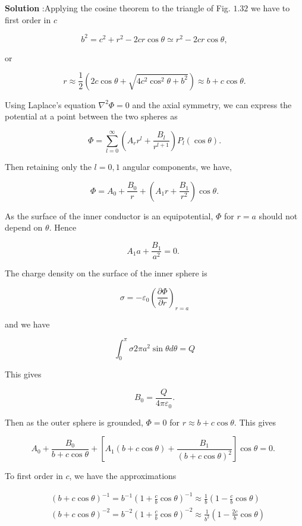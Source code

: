 \documentclass[10pt]{article}
\begin{document}
\textbf{Solution} :Applying the cosine theorem to the triangle of Fig. $1.32$ we have to first order in $c$

$$
b^{2}=c^{2}+r^{2}-2 c r \cos \theta \simeq r^{2}-2 c r \cos \theta,
$$

or

$$
r \approx \frac{1}{2}\left(2 c \cos \theta+\sqrt{4 c^{2} \cos ^{2} \theta+b^{2}}\right) \approx b+c \cos \theta .
$$

 Using Laplace's equation $\nabla^{2} \Phi=0$ and the axial symmetry, we can express the potential at a point between the two spheres as

$$
\Phi=\sum_{l=0}^{\infty}\left(A_{r} r^{l}+\frac{B_{l}}{r^{l+1}}\right) P_{l}(\cos \theta) .
$$

Then retaining only the $l=0,1$ angular components, we have,

$$
\Phi=A_{0}+\frac{B_{0}}{r}+\left(A_{1} r+\frac{B_{1}}{r^{2}}\right) \cos \theta .
$$

As the surface of the inner conductor is an equipotential, $\Phi$ for $r=a$ should not depend on $\theta$. Hence

$$
A_{1} a+\frac{B_{1}}{a^{2}}=0 \text {. }
$$

The charge density on the surface of the inner sphere is

$$
\sigma=-\varepsilon_{0}\left(\frac{\partial \Phi}{\partial r}\right)_{r=a}
$$

and we have

$$
\int_{0}^{\pi} \sigma 2 \pi a^{2} \sin \theta d \theta=Q
$$

This gives

$$
B_{0}=\frac{Q}{4 \pi \varepsilon_{0}} .
$$

Then as the outer sphere is grounded, $\Phi=0$ for $r \approx b+c \cos \theta$. This gives

$$
A_{0}+\frac{B_{0}}{b+c \cos \theta}+\left[A_{1}(b+c \cos \theta)+\frac{B_{1}}{(b+c \cos \theta)^{2}}\right] \cos \theta=0 \text {. }
$$

To first order in $c$, we have the approximations

$$
\begin{aligned}
&(b+c \cos \theta)^{-1}=b^{-1}\left(1+\frac{c}{b} \cos \theta\right)^{-1} \approx \frac{1}{b}\left(1-\frac{c}{b} \cos \theta\right) \\
&(b+c \cos \theta)^{-2}=b^{-2}\left(1+\frac{c}{b} \cos \theta\right)^{-2} \approx \frac{1}{b^{2}}\left(1-\frac{2 c}{b} \cos \theta\right)
\end{aligned}
$$
\end{document}
